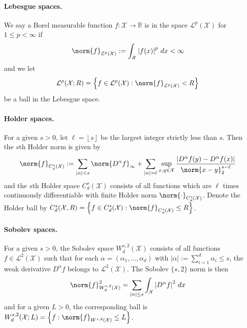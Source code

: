 \documentclass{article}
\newcommand{\Reals}{\mathbb{R}}
\newcommand{\abs}[1]{\left \lvert #1 \right \rvert}
\newcommand{\set}[1]{\left\{#1\right\}}
\newcommand{\floor}[1]{\left\lfloor #1 \right\rfloor}
\newcommand{\1}{\mathbf{1}}
\newcommand{\Xset}{\mathcal{X}}
\theoremstyle{alden}
\theoremstyle{aldenthm}
\theoremstyle{definition}
\theoremstyle{remark}
\begin{document}
\paragraph{Lebesgue spaces.}

We say a Borel measurable function $f: \mathcal{X} \to \Reals$ is in the space $\mathcal{L}^p(\mathcal{X})$ for $1 \leq p < \infty$ if 
$$\norm{f}_{\mathcal{L}^p(\mathcal{X})} := \int_{\mathcal{X}} \abs{f(x)}^p \,dx < \infty$$
and we let 
\begin{equation*}
\mathcal{L}^p(\mathcal{X};R) = \set{f \in \mathcal{L}^p(\mathcal{X}): \norm{f}_{\mathcal{L}^p(\mathcal{X})} < R}
\end{equation*}
be a ball in the Lebesgue space.


\paragraph{Holder spaces.}

For a given $s > 0$, let $\ell = \floor{s}$ be the largest integer strictly less than $s$. Then the $s$th Holder norm is given by
\begin{equation*}
\norm{f}_{C_d^{s}(\mathcal{X})} := \sum_{\abs{\alpha} < s} \norm{D^{\alpha}f}_{\infty} + \sum_{\abs{\alpha} = \ell} \sup_{x,y \in \mathcal{X}} \frac{\abs{D^{\alpha}f(y) - D^{\alpha}f(x)}}{\norm{x - y}_2^{s - \ell}}
\end{equation*}
and the $s$th Holder space $C_d^{s}(\mathcal{X})$ consists of all functions which are $\ell$ times continuously differentiable with finite Holder norm $\norm{\cdot}_{C_d^{s}(\mathcal{X})}$. Denote the Holder ball by $C_d^{s}(\mathcal{X},R) = \set{f \in C_d^{s}(\mathcal{X}): \norm{f}_{C_d^{s}(\mathcal{X})} \leq R}$.

\paragraph{Sobolev spaces.}

For a given $s > 0$, the Sobolev space $W_d^{s,2}(\mathcal{X})$ consists of all functions $f \in \mathcal{L}^2(\mathcal{X})$ such that for each $\alpha = (\alpha_1,\ldots,\alpha_d)$ with $\abs{\alpha} := \sum_{i = 1}^{d} \alpha_i \leq s$, the weak derivative $D^{\alpha}f$ belongs to $\mathcal{L}^2(\mathcal{X})$. The Sobolev $\{s,2\}$ norm is then 
\begin{equation*}
\norm{f}_{W_d^{s,2}(\mathcal{X})}^2 = \sum_{\abs{\alpha} \leq s} \int_{\mathcal{X}} \abs{D^{\alpha}f}^2 \,dx
\end{equation*}
and for a given $L > 0$, the corresponding ball is $W_d^{s,2}(\Xset; L) = \set{f: \norm{f}_{W^{s,2}(\Xset)} \leq L}$.
\end{document}
